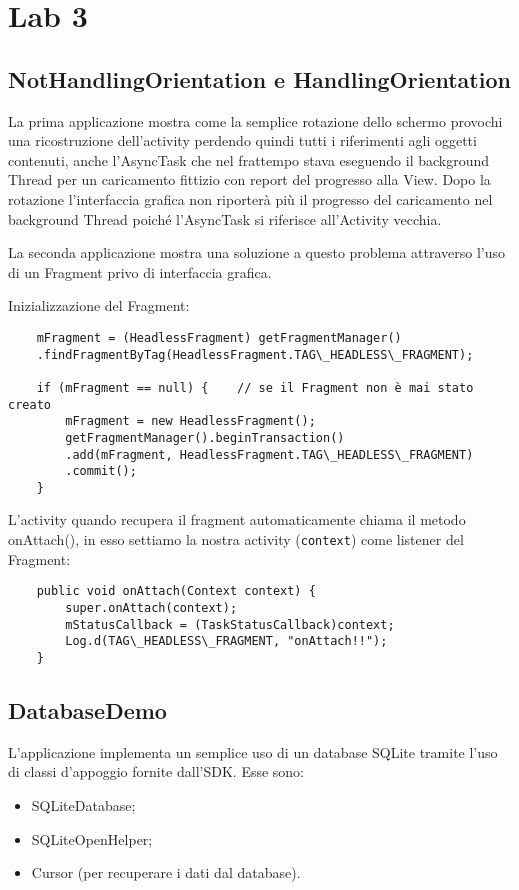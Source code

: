 	\section{Lab 3}

	\subsection{NotHandlingOrientation e HandlingOrientation}
	La prima applicazione mostra come la semplice rotazione dello schermo provochi una ricostruzione dell'activity perdendo quindi tutti i riferimenti agli oggetti contenuti, anche l'AsyncTask che nel frattempo stava eseguendo il background Thread per un caricamento fittizio con report del progresso alla View. Dopo la rotazione l'interfaccia grafica non riporterà più il progresso del caricamento nel background Thread poiché l'AsyncTask si riferisce all'Activity vecchia.

	La seconda applicazione mostra una soluzione a questo problema attraverso l'uso di un Fragment privo di interfaccia grafica.

	Inizializzazione del Fragment:

	\begin{lstlisting}
	mFragment = (HeadlessFragment) getFragmentManager()
	.findFragmentByTag(HeadlessFragment.TAG\_HEADLESS\_FRAGMENT);

	if (mFragment == null) {	// se il Fragment non è mai stato creato
		mFragment = new HeadlessFragment();
		getFragmentManager().beginTransaction()
		.add(mFragment, HeadlessFragment.TAG\_HEADLESS\_FRAGMENT)
		.commit();
	}
	\end{lstlisting}

	L'activity quando recupera il fragment automaticamente chiama il metodo onAttach(), in esso settiamo la nostra activity (\lstinline|context|) come listener del Fragment:

	\begin{lstlisting}
	public void onAttach(Context context) {
		super.onAttach(context);
		mStatusCallback = (TaskStatusCallback)context;
		Log.d(TAG\_HEADLESS\_FRAGMENT, "onAttach!!");
	}
	\end{lstlisting}



	\subsection{DatabaseDemo}
	L'applicazione implementa un semplice uso di un database SQLite tramite l'uso di classi d'appoggio fornite dall'SDK. Esse sono:
	\begin{itemize}
		\item SQLiteDatabase;
		\item SQLiteOpenHelper;
		\item Cursor (per recuperare i dati dal database).
	\end{itemize}

